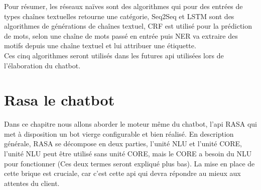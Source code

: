 \pagebreak

Pour résumer, les réseaux naïves sont des algorithmes qui pour des entrées de types chaînes textuelles retourne une catégorie, Seq2Seq et LSTM sont des algorithmes de générations de chaînes textuel, CRF est utilisé pour la prédiction de mots, selon une chaîne de mots passé en entrée puis NER va extraire des motifs depuis une chaîne textuel et lui attribuer une étiquette.\\
\linebreak
Ces cinq algorithmes seront utilisés dans les futures api utilisées lors de l'élaboration du chatbot.\\
\pagebreak

\chapter{Rasa le chatbot}

Dans ce chapitre nous allons aborder le moteur même du chatbot, l'api RASA qui met à disposition un bot vierge configurable et bien réalisé. \linebreak
En description générale, RASA se décompose en deux parties, l'unité NLU et l'unité CORE, l'unité NLU peut être utilisé sans unité CORE, mais le CORE a besoin du NLU pour fonctionner (Ces deux termes seront expliqué plus bas).
La mise en place de cette brique est cruciale, car c'est cette api qui devra répondre au mieux aux attentes du client.

\pagebreak
